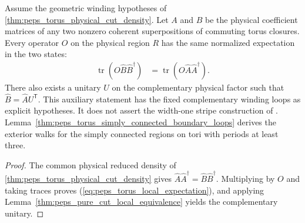 \begin{lemma}%
    \label{thm:peps_torus_physical_local_equivalence}
    \leanok
    Assume the geometric winding hypotheses of
    \ref{thm:peps_torus_physical_cut_density}. Let $A$ and $B$ be the
    physical coefficient matrices of any two nonzero coherent
    superpositions of commuting torus closures. Every operator $O$ on
    the physical region $R$ has the same normalized expectation in
    the two states:
    \begin{align}
        \operatorname{tr}(O\widehat B\widehat B^\dagger)
         & =\operatorname{tr}(O\widehat A\widehat A^\dagger).
        \label{eq:peps_torus_local_expectation}
    \end{align}
    There also exists a unitary $U$ on the complementary physical
    factor such that $\widehat B=\widehat A U^{\mathsf T}$.
    This auxiliary statement has the fixed complementary winding
    loops as explicit hypotheses. It does not assert the width-one
    stripe construction of \cite[Theorem~6.7]{Schuch2010PEPS}.
    Lemma~\ref{thm:peps_torus_simply_connected_boundary_loops}
    derives the exterior walks for the simply connected regions
    on tori with periods at least three.
\end{lemma}

\begin{proof}\leanok
    The common physical reduced density of
    \ref{thm:peps_torus_physical_cut_density} gives
    $\widehat A\widehat A^\dagger=\widehat B\widehat B^\dagger$.
    Multiplying by $O$ and taking traces proves
    (\ref{eq:peps_torus_local_expectation}), and applying
    Lemma~\ref{thm:peps_pure_cut_local_equivalence} yields the complementary unitary.
\end{proof}
